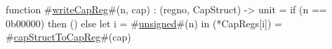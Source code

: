 function #\hyperref[zwriteCapReg]{writeCapReg}#(n, cap) : (regno, CapStruct) -> unit =
  if (n == 0b00000) then
    ()
  else
    let i = #\hyperref[zunsigned]{unsigned}#(n) in
    (*CapRegs[i]) = #\hyperref[zcapStructToCapReg]{capStructToCapReg}#(cap) 
